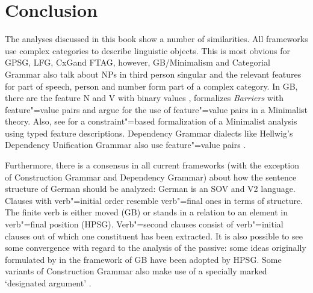 \chapter{Conclusion}

The analyses discussed in this book show a number of similarities. All frameworks use complex categories to describe linguistic objects. This is most obvious for GPSG\indexgpsg,
LFG\indexlfg, CxG\indexcxg and FTAG\indextag, however, GB/Minimalism and Categorial Grammar also talk about NPs in third person singular and the relevant features for part of
speech, person and number form part of a complex category. In GB, there are the feature N and V with binary values \citep[]{Chomsky70a}, \citet[]{Stabler92a-u} formalizes \emph{Barriers} with feature"=value pairs and \citet[--291]{SE2002a} argue for the use of feature"=value pairs in a Minimalist theory\indexmp. Also, see \citet[\page]{Veenstra98a} for a constraint"=based formalization
of a Minimalist analysis using typed feature descriptions. Dependency Grammar dialects like
Hellwig's Dependency Unification Grammar also use feature"=value
pairs \citep[]{Hellwig2003a}.

Furthermore, there is a consensus in all current frameworks (with the exception of Construction
Grammar and Dependency Grammar) about how the sentence structure of German should
be analyzed: German is an SOV and V2 language. Clauses with verb"=initial order resemble verb"=final ones in terms of structure. The finite verb is
either moved (GB) or stands in a relation to an element in verb"=final position (HPSG). Verb"=second
clauses consist of  verb"=initial clauses out of which one constituent has been extracted. It is also possible to see some convergence with regard to the analysis of the passive: some ideas originally formulated
by \citet{Haider84b,Haider85b,Haider86} in the framework of GB have been adopted by HPSG. Some
variants of Construction Grammar also make use of a specially marked `designated
argument' \citep[--57]{MR2001a}.

